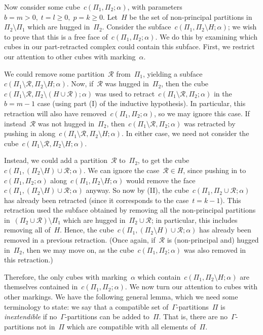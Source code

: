 \documentclass[11pt]{amsart}
\theoremstyle{definition}
\theoremstyle{definition}
\theoremstyle{definition}
\theoremstyle{definition}
\newcommand{\calR}{\mathcal{R}} %
\begin{document}
Now consider some cube~$c(\Pi_1, \Pi_2; \alpha)$, with parameters~$b = m > 0,\; t = l \geq 0,\; p = k \geq 0$. Let~$H$ be the set of non-principal partitions in~$\Pi_2 \setminus \Pi_1$ which are hugged in~$\Pi_2$. Consider the subface~$c(\Pi_1, \Pi_2 \setminus H; \alpha)$; we wish to prove that this is a free face of~$c(\Pi_1, \Pi_2; \alpha)$. We do this by examining which cubes in our part-retracted complex could contain this subface. First, we restrict our attention to other cubes with marking~$\alpha$.

We could remove some partition~$\calR$ from~$\Pi_1$, yielding a subface~$c(\Pi_1 \setminus \calR, \Pi_2 \setminus H; \alpha)$. Now, if~$\calR$ was hugged in~$\Pi_2$, then the cube~$c(\Pi_1 \setminus \calR, \Pi_2 \setminus (H \cup \calR); \alpha)$ was used to retract~$c(\Pi_1 \setminus \calR, \Pi_2; \alpha)$ in the~$b = m-1$ case (using part (I) of the inductive hypothesis). In particular, this retraction will also have removed~$c(\Pi_1, \Pi_2; \alpha)$, so we may ignore this case. If instead~$\calR$ was not hugged in~$\Pi_2$, then~$c(\Pi_1 \setminus \calR, \Pi_2; \alpha)$ was retracted by pushing in along~$c(\Pi_1 \setminus \calR, \Pi_2 \setminus H; \alpha)$. In either case, we need not consider the cube~$c(\Pi_1 \setminus \calR, \Pi_2 \setminus H; \alpha)$.

Instead, we could add a partition~$\calR$ to~$\Pi_2$, to get the cube~$c(\Pi_1, (\Pi_2 \setminus H) \cup \calR; \alpha)$. We can ignore the case~$\calR \in H$, since pushing in to~$c(\Pi_1, \Pi_2; \alpha)$ along~$c(\Pi_1, \Pi_2 \setminus H; \alpha)$ would remove the face~$c(\Pi_1, (\Pi_2 \setminus H) \cup \calR; \alpha)$ anyway. So now by (II), the cube~$c(\Pi_1, \Pi_2 \cup \calR; \alpha)$ has already been retracted (since it corresponds to the case~$t = k-1$). This retraction used the subface obtained by removing all the non-principal partitions in~$(\Pi_2 \cup \calR) \setminus \Pi_1$ which are hugged in~$\Pi_2 \cup \calR$; in particular, this includes removing all of~$H$. Hence, the cube~$c(\Pi_1, (\Pi_2 \setminus H) \cup \calR; \alpha)$ has already been removed in a previous retraction. (Once again, if~$\calR$ is (non-principal and) hugged in~$\Pi_2$, then we may move on, as the cube~$c(\Pi_1, \Pi_2; \alpha)$ was also removed in this retraction.)

Therefore, the only cubes with marking~$\alpha$ which contain~$c(\Pi_1, \Pi_2 \setminus H; \alpha)$ are themselves contained in~$c(\Pi_1, \Pi_2; \alpha)$. We now turn our attention to cubes with other markings. We have the following general lemma, which we need some terminology to state: we say that a compatible set of~$\Gamma$-partitions~$\Pi$ is \emph{inextendible} if no~$\Gamma$-partitions can be added to~$\Pi$. That is, there are no~$\Gamma$-partitions not in~$\Pi$ which are compatible with all elements of~$\Pi$.
\end{document}
